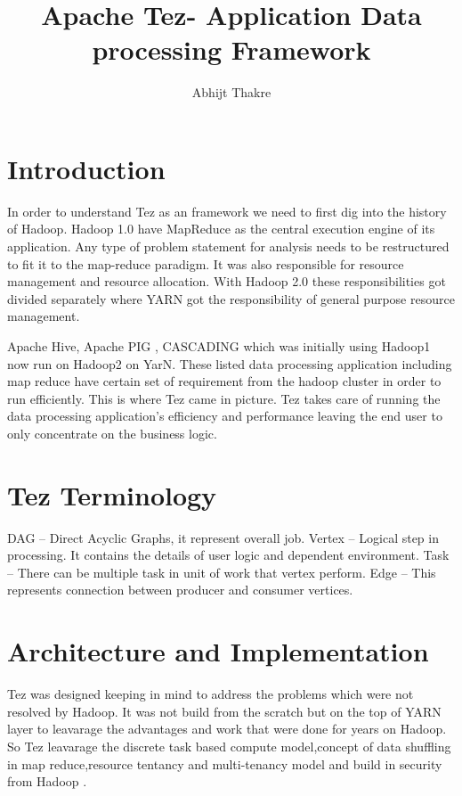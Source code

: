 \documentclass[9pt,twocolumn,twoside]{../../styles/osajnl}
\title{Apache Tez- Application Data processing Framework}
\author[1]{Abhijt Thakre}
\affil[1]{School of Informatics and Computing, Bloomington, IN 47408, U.S.A.}
\affil[2]{Mechanical Engineer,Nagpur University, 2003}
\affil[*]{Corresponding authors: abhijit.thakre@gmail.com}
\begin{document}
\maketitle

\section{Introduction}
 
In order to understand Tez as an framework we need to first dig into the history of Hadoop. Hadoop 1.0 have MapReduce as the central execution engine of its application. Any type of problem statement for analysis needs to be restructured to fit it to the map-reduce paradigm. 
It was also responsible for resource management and resource allocation. With Hadoop 2.0  these responsibilities got divided separately where YARN got the responsibility of general purpose resource management.

\begin{figure}[htbp]
\centering
{}
\caption{\cite{www-tez.org}}
\label{Reference:false-color}
\end{figure}

Apache Hive, Apache PIG , CASCADING which was initially using Hadoop1 now run on Hadoop2 on YarN. These listed data processing application including map reduce have certain set of requirement from the  hadoop cluster in order to run efficiently. This is where Tez came in picture. Tez takes care of running the data processing application's efficiency and performance leaving the end user to only concentrate on the business logic.

\section{Tez Terminology}

 DAG -- Direct Acyclic Graphs, it represent overall job.  
 Vertex -- Logical step in processing. It contains the details of user logic and dependent environment.
 Task --   There can be multiple task in unit of work that vertex perform. 
 Edge --  This represents connection between producer and consumer vertices.


\section{Architecture and Implementation}

Tez was designed keeping in mind to address the problems which were not resolved by Hadoop. 
It was not build from the scratch but on the top of YARN layer to leavarage the 
advantages and work that were done for years on Hadoop. So Tez leavarage the discrete task based compute model,concept of data shuffling in map reduce,resource tentancy and
multi-tenancy model and build in security from Hadoop . 
\end{document}
